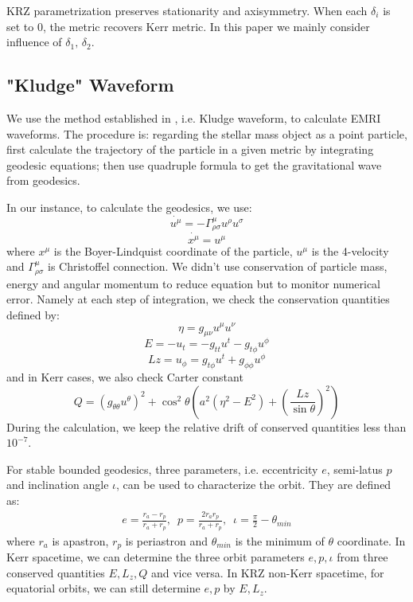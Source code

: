 \documentclass{article}
\begin{document}
KRZ parametrization preserves stationarity and axisymmetry. When each $\delta_i$ is set to 0, the metric recovers Kerr metric. In this paper we mainly consider influence of $\delta_1, \, \delta_2$.

\subsection{"Kludge" Waveform}
\label{p_kludge}
We use the method established in \cite{kludge}, i.e. Kludge waveform, to calculate EMRI waveforms. The procedure is: regarding the stellar mass object as a point particle, first calculate the trajectory of the particle in a given metric by integrating geodesic equations; then use quadruple formula to get the gravitational wave from geodesics.

In our instance, to calculate the geodesics, we use:
\begin{equation}
	\dot{u^\mu}=-\Gamma^\mu_{\rho\sigma}u^\rho u^\sigma
\end{equation}
\begin{equation}
	\dot{x^\mu}=u^\mu 
\end{equation}
where $x^\mu$ is the Boyer-Lindquist coordinate of the particle, $u^\mu$ is the 4-velocity and $\Gamma^\mu_{\rho\sigma}$ is Christoffel connection. We didn't use conservation of particle mass, energy and angular momentum to reduce equation but to monitor numerical error. Namely at each step of integration, we check the conservation quantities defined by:
\begin{equation}
	\eta = g_{\mu\nu} u^\mu u^\nu
\end{equation}
\begin{equation}
	E = -u_t = - g_{tt} u^t -g_{t\phi} u^\phi
\end{equation}
\begin{equation}
	Lz = u_\phi = g_{t\phi } u^t + g_{\phi\phi} u^\phi
\end{equation}
 and in Kerr cases, we also check Carter constant
 \begin{equation}
 	Q = (g_{\theta\theta} u^\theta)^2 + \cos ^2 \theta (a^2 (\eta^2-E^2) + (\frac{Lz}{\sin \theta})^2 )
 \end{equation}
During the calculation, we keep the relative drift of conserved quantities less than $10^{-7}$.

For stable bounded geodesics, three parameters, i.e. eccentricity $e$, semi-latus $p$ and inclination angle $\iota$, can be used to characterize the orbit. They are defined as:
\begin{equation}
\begin{aligned}
e=\frac{r_a-r_p}{r_a+r_p},\,\,\, p=\frac{2r_a r_p}{r_a+r_p},\,\,\, \iota=\frac \pi 2 -\theta_{min}
\end{aligned}
\end{equation} 
where $r_a$ is apastron, $r_p$ is periastron and $\theta_{min}$ is the minimum of $\theta$ coordinate. In Kerr spacetime, we can determine the three orbit parameters $e,p,\iota$ from three conserved quantities $E,L_z,Q$ and vice versa. In KRZ non-Kerr spacetime, for equatorial orbits, we can still determine $e,p$ by $E,L_z$.
\end{document}
